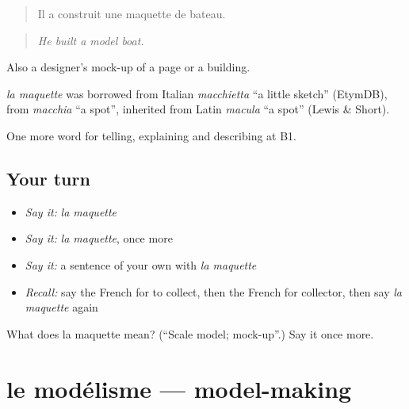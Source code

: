 \begin{quote}
Il a construit une maquette de bateau.
\end{quote}

\begin{quote}
\emph{He built a model boat.}
\end{quote}

Also a designer's mock-up of a page or a building.

\begin{cousinweb}
\emph{la maquette} was borrowed from Italian \emph{macchietta} \textquotedblleft{}a little sketch\textquotedblright{} (EtymDB), from \emph{macchia} \textquotedblleft{}a spot\textquotedblright{}, inherited from Latin \emph{macula} \textquotedblleft{}a spot\textquotedblright{} (Lewis \& Short).
\end{cousinweb}

\begin{grammarlens}[title={What you've built}]
One more word for telling, explaining and describing at B1.
\end{grammarlens}

\subsection*{Your turn}
\begin{itemize}
\raggedright
  \item \emph{Say it:} \emph{la maquette}
  \item \emph{Say it:} \emph{la maquette}, once more
  \item \emph{Say it:} a sentence of your own with \emph{la maquette}
  \item \emph{Recall:} say the French for to collect, then the French for collector, then say \emph{la maquette} again
\end{itemize}

\begin{tcolorbox}[breakable,colback=teal!4,colframe=teal!35!black,title={Before you move on}]
What does la maquette mean? (\textquotedblleft{}Scale model; mock-up\textquotedblright{}.) Say it once more.
\end{tcolorbox}
\section[le modélisme]{le modélisme — model-making}

\label{lesson:FR-C501-modelisme}



